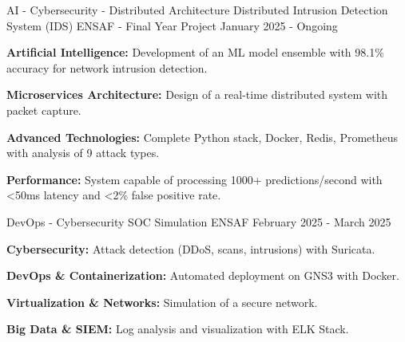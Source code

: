 
\begin{cventries}


    \cventry
    {AI - Cybersecurity - Distributed Architecture}
    {Distributed Intrusion Detection System (IDS)} %
    {ENSAF - Final Year Project} %
    {January 2025 - Ongoing} %
    {
        \begin{cvitems} %
            \item {
                        \textbf{Artificial Intelligence:}
                        Development of an ML model ensemble with 98.1\% accuracy for network intrusion detection.}
            \item {
                        \textbf{Microservices Architecture:}
                        Design of a real-time distributed system with packet capture.}
            \item {
                        \textbf{Advanced Technologies:}
                        Complete Python stack, Docker, Redis, Prometheus with analysis of 9 attack types.}
            \item {
                        \textbf{Performance:}
                        System capable of processing 1000+ predictions/second with <50ms latency and <2\% false positive rate.}
        \end{cvitems}
    }


    \cventry
    {DevOps - Cybersecurity}
    {SOC Simulation} %
    {ENSAF} %
    {February 2025 - March 2025} %
    {
        \begin{cvitems} %
            \item {
                        \textbf{Cybersecurity:}
                        Attack detection (DDoS, scans, intrusions) with Suricata.}
            \item {
                        \textbf{DevOps \& Containerization:}
                        Automated deployment on GNS3 with Docker.}
            \item {
                        \textbf{Virtualization \& Networks:}
                        Simulation of a secure network.}
            \item {
                        \textbf{Big Data \& SIEM:}
                        Log analysis and visualization with ELK Stack.}
        \end{cvitems}
    }

\end{cventries}
